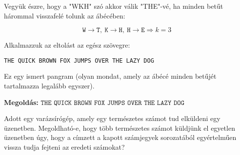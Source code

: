 \begin{solution}
Vegyük észre, hogy a "WKH" szó akkor válik "THE"-vé, ha minden
betűt hárommal visszafelé tolunk az ábécében:

\[
\texttt{W}\rightarrow\texttt{T},\ \texttt{K}\rightarrow\texttt{H},\ \texttt{H}\rightarrow\texttt{E}\Rightarrow k=3
\]

Alkalmazzuk az eltolást az egész szövegre:
\begin{center}
\texttt{THE QUICK BROWN FOX JUMPS OVER THE LAZY DOG} 
\par\end{center}
Ez egy ismert pangram (olyan mondat, amely az ábécé minden betűjét
tartalmazza legalább egyszer).

\textbf{Megoldás:} $\boxed{\texttt{THE QUICK BROWN FOX JUMPS OVER THE LAZY DOG}}$ 
\end{solution}
\begin{extraproblem}
 Adott egy varázsírógép, amely egy természetes számot tud elküldeni
egy üzenetben. Megoldható-e, hogy több természetes számot küldjünk
el egyetlen üzenetben úgy, hogy a címzett a kapott számjegyek sorozatából
egyértelműen vissza tudja fejteni az eredeti számokat? 
\end{extraproblem}

